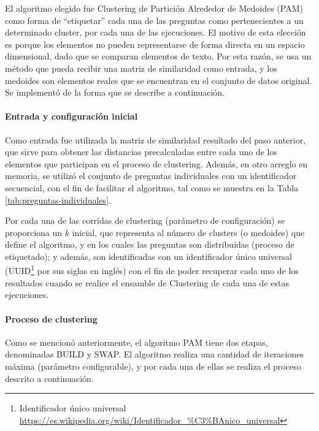 \bigskip El algoritmo elegido fue Clustering de Partición Alrededor de Medoides (PAM) como forma de “etiquetar” cada una de las preguntas como pertenecientes a un determinado cluster, por cada una de las ejecuciones. El motivo de esta elección es porque los elementos no pueden representarse de forma directa en un espacio dimensional, dado que se comparan elementos de texto. Por esta razón, se usa un método que pueda recibir una matriz de similaridad como entrada, y los medoides son elementos reales que se encuentran en el conjunto de datos original. Se implementó de la forma que se describe a continuación.

\paragraph{Entrada y configuración inicial}
Como entrada fue utilizada la matriz de similaridad resultado del paso anterior, que sirve para obtener las distancias precalculadas entre cada uno de los elementos que participan en el proceso de clustering. Además, en otro arreglo en memoria, se utilizó el conjunto de preguntas individuales con un identificador secuencial, con el fin de facilitar el algoritmo, tal como se muestra en la Tabla \ref{tab:preguntas-individuales}.

\bigskip Por cada una de las corridas de clustering (parámetro de configuración) se proporciona un \(k\) inicial, que representa al número de clusters (o medoides) que define el algoritmo, y en los cuales las preguntas son distribuidas (proceso de etiquetado); y además, son identificadas con un identificador único universal (UUID\footnote{Identificador único universal \url{https://es.wikipedia.org/wiki/Identificador\_\%C3\%BAnico_universal}} por sus siglas en inglés) con el fin de poder recuperar cada uno de los resultados cuando se realice el ensamble de Clustering de cada una de estas ejecuciones.

\paragraph{Proceso de clustering}
Como se mencionó anteriormente, el algoritmo PAM tiene dos etapas, denominadas BUILD y SWAP. El algoritmo realiza una cantidad de iteraciones máxima (parámetro configurable), y por cada una de ellas se realiza el proceso descrito a continuación.

